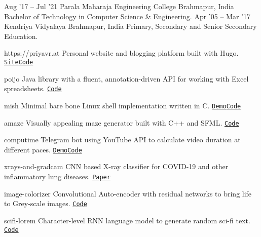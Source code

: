 \documentclass[9pt]{util} %
\begin{document}
\vspace{-10 pt}

\begin{entrylist}
	\entry
	{Aug '17 -- Jul '21}
	{Parala Maharaja Engineering College}
	{Brahmapur, India}
	{Bachelor of Technology in Computer Science \& Engineering.}
	\entry
	{Apr '05 -- Mar '17}
	{Kendriya Vidyalaya}
	{Brahmapur, India}
	{Primary, Secondary and Senior Secondary Education.}
\end{entrylist}

\vspace{-10 pt}


\begin{entrylist}

    \project
    {https://priyavr.at}
    {Personal website and blogging platform built with Hugo.}
    {\texttt{{\href{https://priyavr.at}{Site}}}\slashsep\texttt{{\href{https://github.com/priyavrat-misra/personal-website}{Code}}}}

    \project
    {poijo}
    {Java library with a fluent, annotation-driven API for working with Excel spreadsheets.}
    {\texttt{{\href{https://github.com/priyavrat-misra/poijo}{Code}}}}
    
    \project
    {mish}
    {Minimal bare bone Linux shell implementation written in C.}
    {\texttt{{\href{https://asciinema.org/a/702244}{Demo}}}\slashsep\texttt{{\href{https://github.com/priyavrat-misra/mish}{Code}}}}

    \project
    {amaze}
    {Visually appealing maze generator built with C++ and SFML.}
    {\texttt{{\href{https://github.com/priyavrat-misra/amaze}{Code}}}}

    \project
    {computime}
    {Telegram bot using YouTube API to calculate video duration at different paces.}
    {\texttt{{\href{https://telegram.me/iamspeed_bot}{Demo}}}\slashsep\texttt{{\href{https://github.com/priyavrat-misra/computime}{Code}}}}
    
	\project
	{xrays-and-gradcam}
	{CNN based X-ray classifier for COVID-19 and other inflammatory lung diseases.}
    {{\texttt{\href{https://doi.org/10.1007/s11042-023-16084-4}{Paper}}}}
    
    \project
    {image-colorizer}
    {Convolutional Auto-encoder with residual networks to bring life to Grey-scale images.}
    {\texttt{{\href{https://github.com/priyavrat-misra/image-colorizer}{Code}}}}

    \project
    {scifi-lorem}
    {Character-level RNN language model to generate random sci-fi text.}
    {\texttt{{\href{https://github.com/priyavrat-misra/scifi-lorem}{Code}}}}
    
\end{entrylist}
\end{document}
